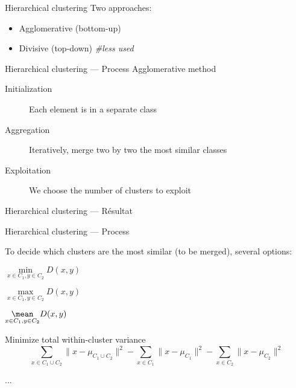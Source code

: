 
\begin{frame}{Hierarchical clustering}
  Two approaches:

  \begin{itemize}
    \item Agglomerative (bottom-up)
    \item Divisive (top-down) \textit{\#less used}
  \end{itemize}
\end{frame}

\begin{frame}{Hierarchical clustering --- Process}
  Agglomerative method

  \begin{description}
    \item[Initialization] Each element is in a separate class
    \item[Aggregation] Iteratively, merge two by two the most similar classes
    \item[Exploitation] We choose the number of clusters to exploit
  \end{description}
\end{frame}

\begin{frame}{Hierarchical clustering --- Résultat}
\end{frame}

\begin{frame}{Hierarchical clustering --- Process}

  To decide which clusters are the most similar (to be merged), several options:

  \begin{description}
  \item[Minimal linkage] $\underset{x \in C_1,y \in C_2}{\min}{D(x,y)}$
  \item[Maximal linkage] $\underset{x \in C_1,y \in C_2}{\max}{D(x,y)}$
  \item[Average linkage] $\underset{x \in C_1,y \in C_2}{\mean}{D(x,y)}$
  \item[Ward linkage] Minimize total within-cluster variance
  \[
    \sum_{x\in C_1\cup C_2} \lVert x - \mu_{C_1\cup C_2} \rVert^2
    - \sum_{x\in C_1} \lVert x - \mu_{C_1} \rVert^2
    - \sum_{x\in C_2} \lVert x - \mu_{C_2} \rVert^2
  \]  
  \item ...
  \end{description}

\end{frame}
